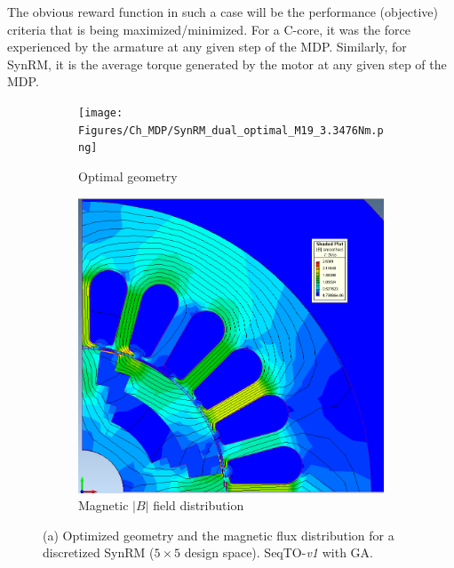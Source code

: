 The obvious reward function in such a case will be the performance (objective) criteria that is being maximized/minimized. For a C-core, it was the force experienced by the armature at any given step of the MDP. Similarly, for SynRM, it is the average torque generated by the motor at any given step of the MDP.

\begin{figure}[h!]
\centering
\begin{subfigure}{.5\textwidth}
  \centering
  \texttt{[image: Figures/Ch\_MDP/SynRM\_dual\_optimal\_M19\_3.3476Nm.png]}
  \caption{Optimal geometry}
  \label{fig:MDP_SynRM_geometry}
\end{subfigure}%
\begin{subfigure}{.5\textwidth}
  \centering
  \includegraphics[width=\linewidth]{Figures/Ch_MDP/B_field_M19_IGTE2020.PNG}
  \caption{Magnetic $\left|B\right|$ field distribution}
  \label{fig:MDP_SynRM_Bfields}
\end{subfigure}
\caption{(a) Optimized geometry and the magnetic flux distribution for a discretized SynRM ($5 \times 5$ design space). SeqTO-\textit{v1} with GA.}
\label{fig:MDP_SynRM_GA_result}
\end{figure}

